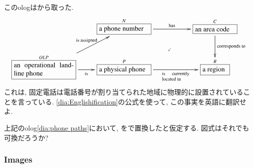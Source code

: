 \begin{exercise}

このologは\cite{Sp1}から取った.
\begin{align}\label{dia:phone paths}\xymatrix{&\obox{N}{1in}{a phone number}\LA{rr}{has}&&\obox{C}{.8in}{an area code}\ar@{}[dll]|{\checkmark}\LA{d}{corresponds to}\\\obox{OLP}{1.2in}{an operational landline phone}\LA{ru}{is assigned}\LAL{r}{is}&\obox{P}{1in}{a physical phone}\LAL{rr}{\parbox{.55in}{\scriptsize is currently located in}}&&\obox{R}{.5in}{a region}}
\end{align} 
これは, 固定電話は電話番号が割り当てられた地域に物理的に設置されていることを言っている. \ref{dia:Englishification}の公式を使って, この事実を英語に翻訳せよ.
\end{exercise}

\begin{exercise}
上記のolog\eqref{dia:phone paths}において, をで置換したと仮定する. 図式はそれでも可換だろうか?
\end{exercise}


\subsubsection{Images}\label{sec:images}


